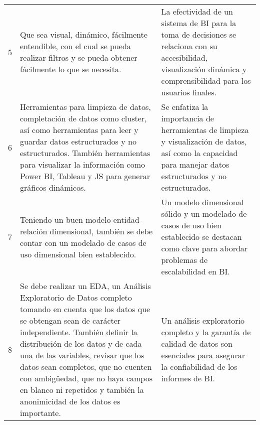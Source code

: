 \begin{longtable}{|p{0.6cm}|p{6cm}|p{6cm}|}
    5                                                 & Que sea visual, dinámico, fácilmente entendible, con el cual se pueda realizar filtros y se pueda obtener fácilmente lo que se necesita.                                                                                                                                                                                                                                                              & La efectividad de un sistema de BI para la toma de decisiones se relaciona con su accesibilidad, visualización dinámica y comprensibilidad para los usuarios finales.                                                 \\
    6                                                 & Herramientas para limpieza de datos, completación de datos como cluster, así como herramientas para leer y guardar datos estructurados y no estructurados. También herramientas para visualizar la información como Power BI, Tableau y JS para generar gráficos dinámicos.                                                                                                                           & Se enfatiza la importancia de herramientas de limpieza y visualización de datos, así como la capacidad para manejar datos estructurados y no estructurados.                                                           \\
    7                                                 & Teniendo un buen modelo entidad-relación dimensional, también se debe contar con un modelado de casos de uso dimensional bien establecido.                                                                                                                                                                                                                                                            & Un modelo dimensional sólido y un modelado de casos de uso bien establecido se destacan como clave para abordar problemas de escalabilidad en BI.                                                                     \\
    8                                                 & Se debe realizar un EDA, un Análisis Exploratorio de Datos completo tomando en cuenta que los datos que se obtengan sean de carácter independiente. También definir la distribución de los datos y de cada una de las variables, revisar que los datos sean completos, que no cuenten con ambigüedad, que no haya campos en blanco ni repetidos y también la anonimicidad de los datos es importante. & Un análisis exploratorio completo y la garantía de calidad de datos son esenciales para asegurar la confiabilidad de los informes de BI.                                                                              \\

\end{longtable}
